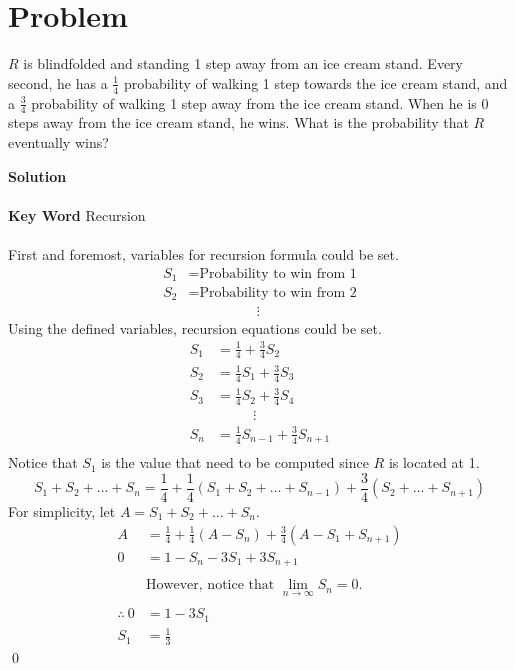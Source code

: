 \documentclass{article}
\newenvironment{solution}{\begin{trivlist}\item[]{\bf Solution}}{\qed \end{trivlist}}
\begin{document}
\section*{Problem}
$R$ is blindfolded and standing 1 step away from an ice cream stand. Every second, he has a $\frac{1}{4}$ probability of walking 1 step towards the ice cream stand, and a $\frac{3}{4}$ probability of walking 1 step away from the ice cream stand. When he is 0 steps away from the ice cream stand, he wins. What is the probability that $R$ eventually wins?
\begin{solution}
\\\\
\textbf{Key Word} Recursion
\\\\
First and foremost, variables for recursion formula could be set.
\begin{align*}
    S_1&=\text{Probability to win from 1} \\
    S_2&=\text{Probability to win from 2} \\
    &\ \ \ \ \ \ \ \ \ \ \ \ \ \ \ \ \ \ \ \ \ \ \vdots
\end{align*}
Using the defined variables, recursion equations could be set.
\begin{align*}
    S_1&=\frac{1}{4}+\frac{3}{4}S_2 \\
    S_2&=\frac{1}{4}S_1+\frac{3}{4}S_3 \\
    S_3&=\frac{1}{4}S_2+\frac{3}{4}S_4 \\
    &\ \ \ \ \ \ \ \ \ \ \ \ \vdots \\
    S_n&=\frac{1}{4}S_{n-1}+\frac{3}{4}S_{n+1} \\
\end{align*}
Notice that $S_1$ is the value that need to be computed since $R$ is located at 1.
\[
S_1+S_2+\dots+S_n=\frac{1}{4}+\frac{1}{4}(S_1+S_2+\dots+S_{n-1})+\frac{3}{4}(S_2+\dots+S_{n+1})
\]
For simplicity, let $A=S_1+S_2+\dots+S_n$.
\begin{align*}
A&=\frac{1}{4}+\frac{1}{4}(A-S_n)+\frac{3}{4}(A-S_1+S_{n+1}) \\
0&=1-S_n-3S_1+3S_{n+1}
\\\\
&\text{However, notice that }\lim_{n\rightarrow\infty}S_n=0.
\\\\
\therefore\ 0&=1-3S_1\\
S_1&=\boxed{\frac{1}{3}}
\end{align*}
\end{solution}
\end{document}
